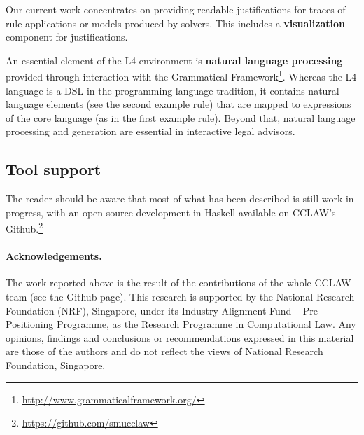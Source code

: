 \documentclass[10pt,a4paper]{article}
\begin{document}
Our current work concentrates on providing readable justifications for traces
of rule applications or models produced by solvers. This includes a \textbf{visualization} component for justifications. 

An essential element of the L4 environment is \textbf{natural language processing} provided through interaction with the Grammatical Framework\footnote{\url{http://www.grammaticalframework.org/}}. Whereas the L4 language is a DSL in the programming language tradition, it contains natural language elements (see the second example rule) that are mapped to expressions of the core language (as in the first example rule). Beyond that, natural language processing and generation are essential in interactive legal advisors.

\subsection{Tool support}\label{sec:tool_support}

The reader should be aware that most of what has been described is still work
in progress, with an open-source development in
Haskell available on CCLAW's Github.\footnote{\url{https://github.com/smucclaw}} 


\paragraph{Acknowledgements.} The work reported above is the result of the contributions of the whole CCLAW team (see the Github page).
This research is supported by the National Research Foundation (NRF),
Singapore, under its Industry Alignment Fund -- Pre-Positioning Programme, as
the Research Programme in Computational Law. Any opinions, findings and
conclusions or recommendations expressed in this material are those of the
authors and do not reflect the views of National Research Foundation,
Singapore.

% 
% 


\end{document}
